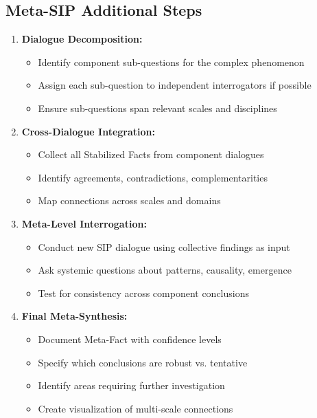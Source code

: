 \documentclass[11pt,a4paper]{article}
\begin{document}
\begin{small}
\subsection*{Meta-SIP Additional Steps}
\begin{enumerate}[leftmargin=*, resume]
    \item \textbf{Dialogue Decomposition:}
    \begin{itemize}[nosep]
        \item Identify component sub-questions for the complex phenomenon
        \item Assign each sub-question to independent interrogators if possible
        \item Ensure sub-questions span relevant scales and disciplines
    \end{itemize}
    
    \item \textbf{Cross-Dialogue Integration:}
    \begin{itemize}[nosep]
        \item Collect all Stabilized Facts from component dialogues
        \item Identify agreements, contradictions, complementarities
        \item Map connections across scales and domains
    \end{itemize}
    
    \item \textbf{Meta-Level Interrogation:}
    \begin{itemize}[nosep]
        \item Conduct new SIP dialogue using collective findings as input
        \item Ask systemic questions about patterns, causality, emergence
        \item Test for consistency across component conclusions
    \end{itemize}
    
    \item \textbf{Final Meta-Synthesis:}
    \begin{itemize}[nosep]
        \item Document Meta-Fact with confidence levels
        \item Specify which conclusions are robust vs. tentative
        \item Identify areas requiring further investigation
        \item Create visualization of multi-scale connections
    \end{itemize}
\end{enumerate}


\end{small}
\end{document}
